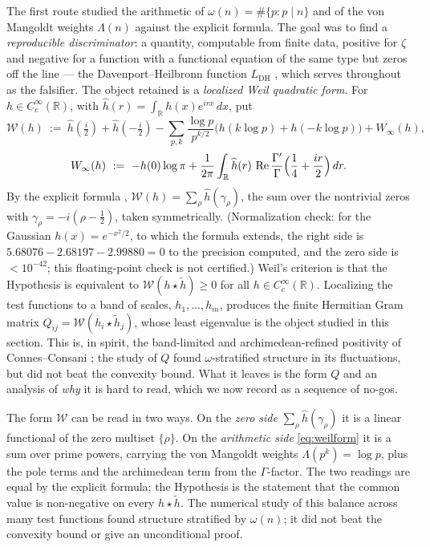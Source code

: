 \documentclass[11pt]{amsart}
\theoremstyle{definition}
\theoremstyle{remark}
\theoremstyle{definition}
\renewcommand{\Re}{\operatorname{Re}}
\newcommand{\R}{\mathbb{R}}
\begin{document}
The first route studied the arithmetic of $\omega(n)=\#\{p:p\mid n\}$ and of the von Mangoldt weights
$\Lambda(n)$ against the explicit formula. The goal was to find a \emph{reproducible discriminator}: a quantity, computable from finite data, positive for
$\zeta$ and negative for a function with a functional equation of the same type but zeros off the line --- the
Davenport--Heilbronn function $L_{\mathrm{DH}}$ \cite{DavenportHeilbronn,Titchmarsh}, which serves
throughout as the falsifier. The object retained is a \emph{localized Weil quadratic form}. For
$h\in C_c^\infty(\R)$, with $\widehat h(r)=\int_\R h(x)e^{irx}\,dx$, put
\begin{equation}\label{eq:weilform}
   \mathcal W(h)\ :=\ \widehat h(\tfrac i2)+\widehat h(-\tfrac i2)
   -\sum_{p,k}\frac{\log p}{p^{k/2}}\bigl(h(k\log p)+h(-k\log p)\bigr)+W_\infty(h),
\end{equation}
\[
   W_\infty(h)\ :=\ -h(0)\log\pi+\frac1{2\pi}\int_{\R}\widehat h(r)\,
   \Re\frac{\Gamma'}{\Gamma}\Bigl(\frac14+\frac{ir}2\Bigr)\,dr .
\]
By the explicit formula \cite{Weil1952}, $\mathcal W(h)=\sum_\rho\widehat h(\gamma_\rho)$, the sum over
the nontrivial zeros with $\gamma_\rho=-i(\rho-\tfrac12)$, taken symmetrically. (Normalization check: for the Gaussian $h(x)=e^{-x^2/2}$, to which the formula extends, the right side is $5.68076-2.68197-2.99880=0$ to the precision computed, and the zero side is $<10^{-42}$; this floating-point check is not certified.) Weil's criterion \cite{Weil1952} is that the Hypothesis is equivalent to
$\mathcal W(h\star\tilde h)\ge0$ for all $h\in C_c^\infty(\R)$. Localizing the test functions to a band of
scales, $h_1,\dots,h_m$, produces the finite Hermitian Gram matrix $Q_{ij}=\mathcal W(h_i\star\tilde h_j)$,
whose least eigenvalue is the object studied in this section. This is, in spirit, the band-limited and
archimedean-refined positivity of Connes--Consani \cite{connesconsani2021}; the study of $Q$ found
$\omega$-stratified structure in its fluctuations, but did not beat the convexity bound. What it leaves is
the form $Q$ and an analysis of \emph{why} it is hard to read, which we now record as a sequence of no-gos.

The form $\mathcal W$ can be read in two ways. On the \emph{zero side} $\sum_\rho\widehat h(\gamma_\rho)$ it
is a linear functional of the zero multiset $\{\rho\}$. On the \emph{arithmetic side} \eqref{eq:weilform}
it is a sum over prime powers, carrying the von Mangoldt weights $\Lambda(p^k)=\log p$, plus the pole
terms and the archimedean term from the $\Gamma$-factor. The two readings are equal by the explicit
formula; the Hypothesis is the statement that the common value is non-negative on every $h\star\tilde h$.
The numerical study of this balance across many test functions found structure stratified by
$\omega(n)$; it did not beat the convexity bound or give an unconditional proof.
\end{document}
